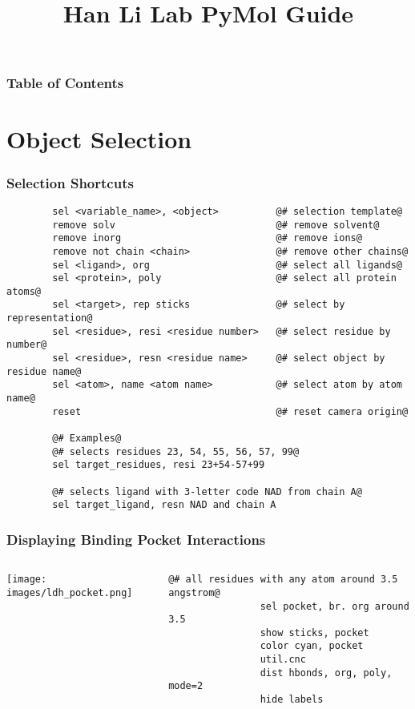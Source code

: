 \documentclass[aspectratio=169]{beamer}
\title{Han Li Lab PyMol Guide}
\institute{University of California, Irvine}
\begin{document}
\begin{frame}
    \maketitle
\end{frame}

\begin{frame}
    \frametitle{Table of Contents}
        \tableofcontents
\end{frame}

\section{Object Selection}

\begin{frame}[fragile]
\frametitle{Selection Shortcuts}
    \begin{lstlisting}
        sel <variable_name>, <object>          @# selection template@
        remove solv                            @# remove solvent@
        remove inorg                           @# remove ions@
        remove not chain <chain>               @# remove other chains@
        sel <ligand>, org                      @# select all ligands@
        sel <protein>, poly                    @# select all protein atoms@
        sel <target>, rep sticks               @# select by representation@
        sel <residue>, resi <residue number>   @# select residue by number@
        sel <residue>, resn <residue name>     @# select object by residue name@
        sel <atom>, name <atom name>           @# select atom by atom name@
        reset                                  @# reset camera origin@

        @# Examples@
        @# selects residues 23, 54, 55, 56, 57, 99@
        sel target_residues, resi 23+54-57+99    

        @# selects ligand with 3-letter code NAD from chain A@ 
        sel target_ligand, resn NAD and chain A

    \end{lstlisting}
\end{frame}


\begin{frame}[fragile]
\frametitle{Displaying Binding Pocket Interactions}
    \begin{columns}
        \begin{column}{0.50\textwidth}
            \texttt{[image: images/ldh\_pocket.png]}
        \end{column}
        \begin{column}{0.45\textwidth}
           \begin{lstlisting}[mathescape=true]
                @# all residues with any atom around 3.5 angstrom@
                sel pocket, br. org around 3.5
                show sticks, pocket
                color cyan, pocket
                util.cnc
                dist hbonds, org, poly, mode=2
                hide labels
            \end{lstlisting}
        \end{column}
    \end{columns}
\end{frame}
\end{document}
